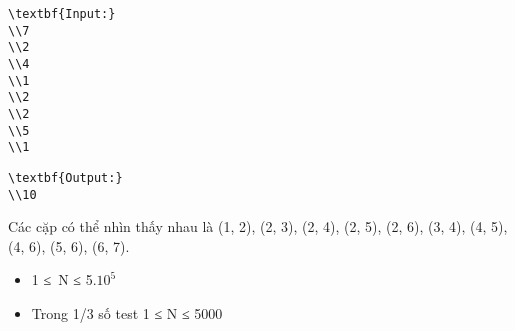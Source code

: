 \begin{verbatim}
\textbf{Input:}
\\7
\\2
\\4
\\1
\\2
\\2
\\5
\\1 \end{verbatim}
\begin{verbatim}
\textbf{Output:}
\\10\end{verbatim}
Các cặp có thể nhìn thấy nhau là (1, 2), (2, 3), (2, 4), (2, 5), (2, 6), (3, 4), (4, 5), (4, 6), (5, 6), (6, 7).
\begin{itemize}
	\item     1 ≤ N ≤ 5.$10^{5}$
	\item     Trong 1/3 số test 1 ≤ N ≤ 5000   
\end{itemize}
